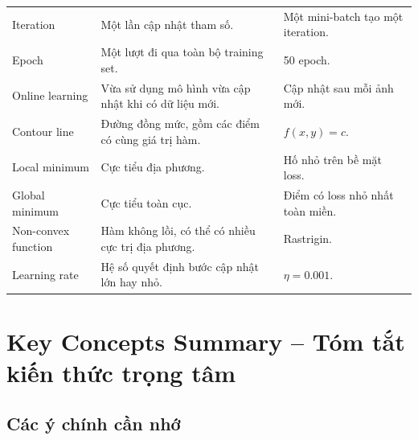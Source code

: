 \begin{longtable}{p{}p{}p{}}
Iteration & Một lần cập nhật tham số. & Một mini-batch tạo một iteration. \\

Epoch & Một lượt đi qua toàn bộ training set. & 50 epoch. \\

Online learning & Vừa sử dụng mô hình vừa cập nhật khi có dữ liệu mới. & Cập nhật sau mỗi ảnh mới. \\

Contour line & Đường đồng mức, gồm các điểm có cùng giá trị hàm. & $f(x,y)=c$. \\

Local minimum & Cực tiểu địa phương. & Hố nhỏ trên bề mặt loss. \\

Global minimum & Cực tiểu toàn cục. & Điểm có loss nhỏ nhất toàn miền. \\

Non-convex function & Hàm không lồi, có thể có nhiều cực trị địa phương. & Rastrigin. \\

Learning rate & Hệ số quyết định bước cập nhật lớn hay nhỏ. & $\eta=0.001$. \\

\bottomrule
\end{longtable}
\normalsize

\section{Key Concepts Summary -- Tóm tắt kiến thức trọng tâm}

\subsection{Các ý chính cần nhớ}

